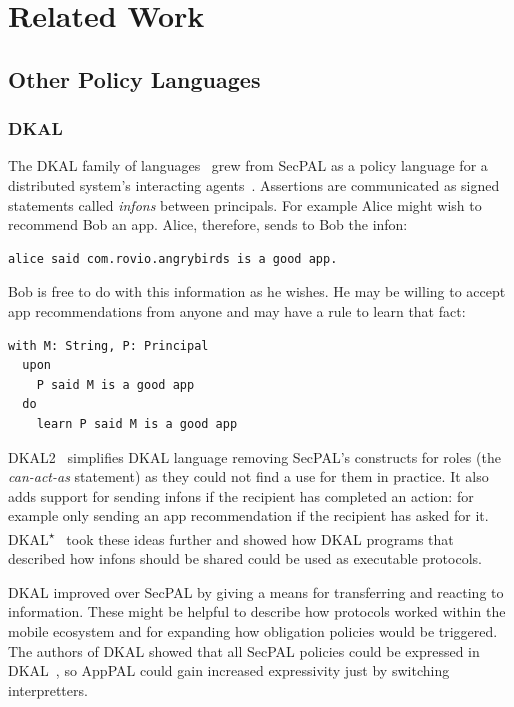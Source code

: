 \documentclass[thesis.tex]{subfiles}
\begin{document}
    \chapter{Related Work}
    \label{chap:related-work}
   
\section{Other Policy Languages}

\subsection{DKAL}

The DKAL family of
languages~\cite{jeannin_dkal*:_2013,gurevich_dkal:_2008,yuri_gurevich_dkal2---simplified_2009}
grew from SecPAL as a policy language for a distributed
system's interacting agents~\cite{blass_introduction_2012}. Assertions are
communicated as signed statements called \emph{infons} between principals. For
example Alice might wish to recommend Bob an app. Alice, therefore, sends to Bob
the infon:

\begin{lstlisting}
alice said com.rovio.angrybirds is a good app.
\end{lstlisting}

Bob is free to do with this information as he wishes.  He may be
willing to accept app recommendations from anyone and may have a rule
to learn that fact:

\begin{lstlisting}
with M: String, P: Principal
  upon
    P said M is a good app
  do
    learn P said M is a good app
\end{lstlisting}

DKAL2~\cite{yuri_gurevich_dkal2---simplified_2009} simplifies DKAL
language removing SecPAL's constructs for roles (the \emph{can-act-as} statement)
as they could not find a use for them in practice.  It also adds
support for sending infons if the recipient has completed an action:
for example only sending an app recommendation if the recipient has
asked for it.
DKAL\textsuperscript{$\star$}~\cite{jeannin_dkal*:_2013} took these
ideas further and showed how DKAL programs that described how infons
should be shared could be used as executable protocols.

DKAL improved over SecPAL by giving a means for transferring and reacting to
information. These might be helpful to describe how protocols worked within the
mobile ecosystem and for expanding how obligation policies would be triggered.
The authors of DKAL showed that all SecPAL policies could be expressed in
DKAL~\cite{gurevich_dkal:_2008}, so AppPAL could gain increased expressivity
just by switching interpretters.
\end{document}
